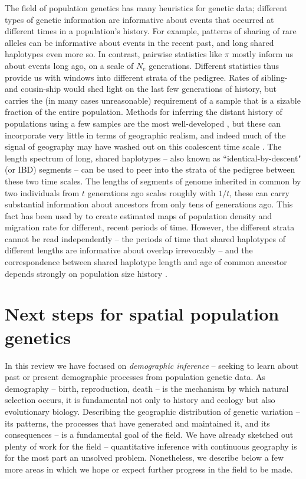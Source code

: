 \documentclass{ar-1col}
\newcommand{\g}[1]{{\color{blue}{#1}}}
\renewcommand{\emph}[1]{{\textit{#1}}}
\begin{document}
{The field of population genetics has many heuristics for genetic data; 
different types of genetic information are informative 
about events that occurred at different times in a population's history.
For example, patterns of sharing of rare alleles can be informative about events in the recent past,
and long shared haplotypes even more so.
In contrast, pairwise statistics like $\pi$ \g{or $F_{ST}$} mostly inform us about events long ago,
on a scale of $N_e$ generations.
Different statistics thus provide us with windows into different strata of the pedigree.
Rates of sibling- and cousin-ship 
would shed light on the last few generations of history,
but carries the (in many cases unreasonable) requirement of a sample 
that is a sizable fraction of the entire population.
Methods for inferring the distant history of populations using a few samples
are the most well-developed \citep[e.g.,][]{dadi,Li_Durbin2011,momi},
but these can incorporate very little in terms of geographic realism,
and indeed much of the signal of geography 
may have washed out on this coalescent time scale \citep{wilkins2004separationoftimescales}.
The length spectrum of long, shared haplotypes --
also known as ``identical-by-descent" (or IBD) segments --
can be used to peer into the strata of the pedigree between these two time scales.
The lengths of segments of genome inherited in common by two individuals
from $t$ generations ago scales roughly with $1/t$, 
these can carry substantial information about ancestors from only tens of generations ago.
This fact has been used by \citet{alasadi2018estimating}
to create estimated maps of population density and migration rate
for different, recent periods of time.
However, the different strata cannot be read independently
-- the periods of time that shared haplotypes of different lengths are informative about 
overlap irrevocably
-- and the correspondence between shared haplotype length and age of common ancestor
depends strongly on population size history \citep{ralph2013geography}.


\section{Next steps for spatial population genetics}

In this review we have focused on \emph{demographic inference} --
seeking to learn about past or present demographic processes
from population genetic data.
As demography -- birth, reproduction, death -- 
is the mechanism by which natural selection occurs,
it is fundamental not only to history and ecology but also evolutionary biology.
Describing the geographic distribution of genetic variation -- 
its patterns, 
the processes that have generated and maintained it, 
and its consequences -- 
is a fundamental goal of the field.
We have already sketched out plenty of work for the field
-- quantitative inference with continuous geography is for the most part an unsolved problem.
Nonetheless, we describe below a few more areas 
in which we hope or expect further progress in the field to be made.


}
\end{document}
